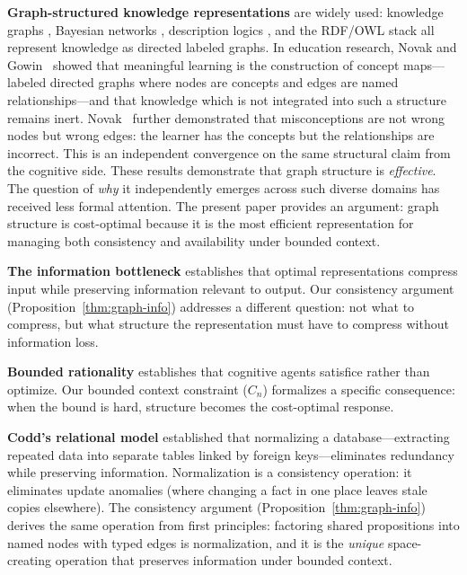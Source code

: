 \documentclass[11pt]{article}
\theoremstyle{definition}
\begin{document}
\textbf{Graph-structured knowledge representations} are widely used:
knowledge graphs \cite{Hogan2021}, Bayesian networks \cite{Pearl1988},
description logics \cite{BaaderCalvaneseEtAl2003}, and the
RDF/OWL stack \cite{BernersLee2001} all represent knowledge as directed
labeled graphs. In education research, Novak and Gowin~\cite{Novak1984}
showed that meaningful learning is the construction of concept maps---labeled
directed graphs where nodes are concepts and edges are named
relationships---and that knowledge which is not integrated into such a
structure remains inert. Novak~\cite{Novak1990} further demonstrated that
misconceptions are not wrong nodes but wrong edges: the learner has the
concepts but the relationships are incorrect. This is an independent
convergence on the same structural claim from the cognitive side.
These results demonstrate that graph structure is
\emph{effective}. The question of \emph{why} it independently emerges
across such diverse domains has received less formal attention. The
present paper provides an argument: graph structure is cost-optimal
because it is the most efficient representation for managing both
consistency and availability under bounded context.

\textbf{The information bottleneck} \cite{Tishby2000} establishes that
optimal representations compress input while preserving information
relevant to output. Our consistency argument
(Proposition~\ref{thm:graph-info}) addresses a different question: not what
to compress, but what structure the representation must have to compress
without information loss.

\textbf{Bounded rationality} \cite{Simon1955} establishes that cognitive
agents satisfice rather than optimize. Our bounded context constraint
($C_n$) formalizes a specific consequence: when the bound is hard,
structure becomes the cost-optimal response.

\textbf{Codd's relational model} \cite{Codd1970} established that normalizing
a database---extracting repeated data into separate tables linked by
foreign keys---eliminates redundancy while preserving information.
Normalization is a consistency operation: it eliminates update anomalies
(where changing a fact in one place leaves stale copies elsewhere).
The consistency argument (Proposition~\ref{thm:graph-info})
derives the same operation from first principles: factoring
shared propositions into named nodes with typed edges is normalization,
and it is the \emph{unique} space-creating operation that preserves
information under bounded context.
\end{document}
